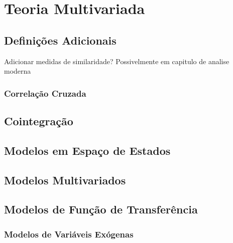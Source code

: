 \chapter{Teoria Multivariada}\label{chap:multi}

\section{Definições Adicionais}

Adicionar medidas de similaridade? Possivelmente em capitulo de analise
moderna

\subsection{Correlação Cruzada}

\section{Cointegração}

\section{Modelos em Espaço de Estados}

\section{Modelos Multivariados}

\section{Modelos de Função de Transferência}

\subsection{Modelos de Variáveis Exógenas}
